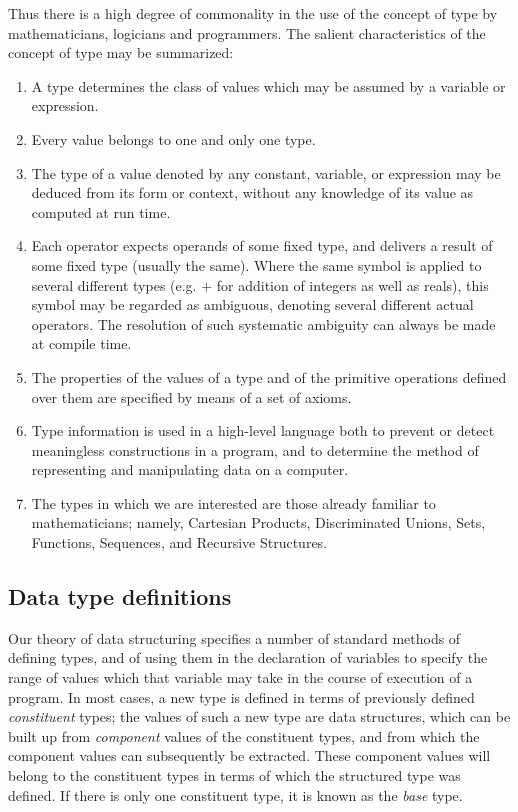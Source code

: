 Thus there is a high degree of commonality in the use of the concept of type by mathematicians, logicians and programmers. The salient characteristics of the concept of type may be summarized:

\begin{enumerate}[wide, nosep, label=(\arabic*)]
	\item A type determines the class of values which may be assumed by a variable or expression.
	\item Every value belongs to one and only one type.
	\item The type of a value denoted by any constant, variable, or expression may be deduced from its form or context, without any knowledge of its value as computed at run time.
	\item Each operator expects operands of some fixed type, and delivers a result of some fixed type (usually the same). Where the same symbol is applied to several different types (e.g. $+$ for addition of integers as well as reals), this symbol may be regarded as ambiguous, denoting several different actual operators. The resolution of such systematic ambiguity can always be made 	at compile time.
	\item  The properties of the values of a type and of the primitive operations defined over them are specified by means of a set of axioms.
	\item Type information is used in a high-level language both to prevent or detect meaningless constructions in a program, and to determine the method of representing and manipulating data on a computer.
	\item The types in which we are interested are those already familiar to mathematicians; namely, Cartesian Products, Discriminated Unions, Sets, Functions, Sequences, and Recursive Structures.
\end{enumerate}

\subsection{Data type definitions}

Our theory of data structuring specifies a number of standard methods of defining types, and of using them in the declaration of variables to specify the range of values which that variable may take in the course of execution of a program. In most cases, a new type is defined in terms of previously defined \textit{constituent} types; the values of such a new type are data structures, which can be built up from \textit{component} values of the constituent types, and from which the component values can subsequently be extracted. These component values will belong to the constituent types in terms of which the structured type was defined. If there is only one constituent type, it is known as the \textit{base} type.

